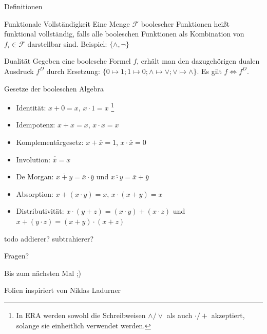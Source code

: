\documentclass[
  german,            %
  aspectratio=169,    %
]{tumbeamer}
\begin{document}
\begin{frame}[c, fragile]{Definitionen}{}
 \begin{block}{Funktionale Vollständigkeit}
      Eine Menge $\mathcal{F}$ boolescher Funktionen heißt funktional vollständig, falls alle booleschen Funktionen als Kombination von $f_i\in\mathcal{F}$ darstellbar sind. Beispiel: $\{\wedge, \neg\}$
 \end{block}
 \vfill
 \begin{block}{Dualität}
  Gegeben eine boolesche Formel $f$, erhält man den dazugehörigen dualen Ausdruck $f^D$ durch Ersetzung: $\{0\mapsto 1; 1\mapsto 0; \wedge\mapsto\vee; \vee\mapsto\wedge\}$. Es gilt $f \Leftrightarrow f^D$.\footnotemark
\end{block}
\end{frame}

\begin{frame}[c, fragile]{Gesetze der booleschen Algebra}{}
  \begin{itemize}
    \item Identität: $x+0=x$, $x\cdot 1=x$ \footnote[1]{In ERA werden sowohl die Schreibweisen $\wedge/\vee$ als auch $\cdot / +$ akzeptiert, solange sie einheitlich verwendet werden.}
    \item Idempotenz: $x+x=x$, $x\cdot x=x$
    \item Komplementärgesetz: $x+\overline{x}=1$, $x\cdot\overline{x}=0$
    \item Involution: $\overline{\overline{x}}=x$
    \item De Morgan: $\overline{x+y}=\overline{x}\cdot\overline{y}$ und $\overline{x\cdot y}=\overline{x}+\overline{y}$
    \item Absorption: $x+(x\cdot y)=x$, $x\cdot(x+y)=x$
    \item Distributivität: $x\cdot(y+z)=(x\cdot y)+ (x\cdot z)$ und $x+(y\cdot z)=(x+y)\cdot (x+z)$
  \end{itemize}
\end{frame}

\begin{frame}[c, fragile]{todo}{}
  addierer?
  subtrahierer?
\end{frame}

\begin{frame}[c]{}{}
  \begin{center}
    \LARGE Fragen?
  \end{center}
  \vspace{0.5cm}
  \begin{center}
    \LARGE Bis zum nächsten Mal ;) \\
  \end{center}
  \vspace{1.0cm}
  \begin{center}
    \small Folien inspiriert von Niklas Ladurner
  \end{center}
\end{frame}
\end{document}
